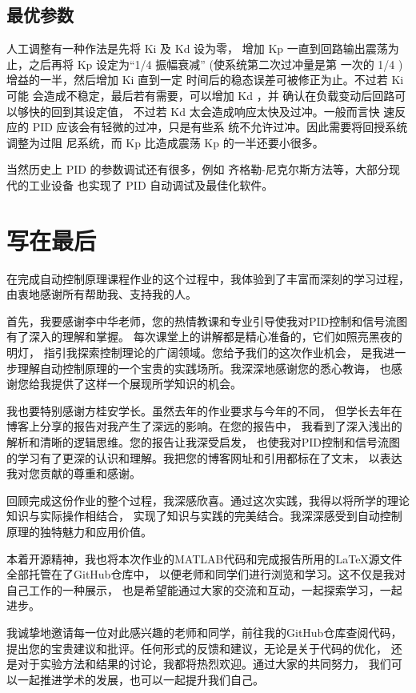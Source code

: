 \documentclass{thuemp}
\begin{document}
\subsection{最优参数}
人工调整有一种作法是先将 Ki 及 Kd 设为零，
增加 Kp 一直到回路输出震荡为止，之后再将 Kp
设定为“1/4 振幅衰减” (使系统第二次过冲量是第
一次的 1/4 ) 增益的一半，然后增加 Ki 直到一定
时间后的稳态误差可被修正为止。不过若 Ki 可能
会造成不稳定，最后若有需要，可以增加 Kd ，并
确认在负载变动后回路可以够快的回到其设定值，
不过若 Kd 太会造成响应太快及过冲。一般而言快
速反应的 PID 应该会有轻微的过冲，只是有些系
统不允许过冲。因此需要将回授系统调整为过阻
尼系统，而 Kp 比造成震荡 Kp 的一半还要小很多。\cite{PID}

当然历史上 PID 的参数调试还有很多，例如
齐格勒-尼克尔斯方法等，大部分现代的工业设备
也实现了 PID 自动调试及最佳化软件。

\section*{写在最后}
在完成自动控制原理课程作业的这个过程中，我体验到了丰富而深刻的学习过程，
由衷地感谢所有帮助我、支持我的人。

首先，我要感谢李中华老师，您的热情教课和专业引导使我对PID控制和信号流图有了深入的理解和掌握。
每次课堂上的讲解都是精心准备的，它们如照亮黑夜的明灯，
指引我探索控制理论的广阔领域。您给予我们的这次作业机会，
是我进一步理解自动控制原理的一个宝贵的实践场所。我深深地感谢您的悉心教诲，
也感谢您给我提供了这样一个展现所学知识的机会。

我也要特别感谢方桂安学长。虽然去年的作业要求与今年的不同，
但学长去年在博客上分享的报告对我产生了深远的影响。在您的报告中，
我看到了深入浅出的解析和清晰的逻辑思维。您的报告让我深受启发，
也使我对PID控制和信号流图的学习有了更深的认识和理解。我把您的博客网址和引用都标在了文末，
以表达我对您贡献的尊重和感谢。

回顾完成这份作业的整个过程，我深感欣喜。通过这次实践，我得以将所学的理论知识与实际操作相结合，
实现了知识与实践的完美结合。我深深感受到自动控制原理的独特魅力和应用价值。

本着开源精神，我也将本次作业的MATLAB代码和完成报告所用的\LaTeX 源文件全部托管在了GitHub仓库中，
以便老师和同学们进行浏览和学习。这不仅是我对自己工作的一种展示，
也是希望能通过大家的交流和互动，一起探索学习，一起进步。

我诚挚地邀请每一位对此感兴趣的老师和同学，前往我的GitHub仓库查阅代码，
提出您的宝贵建议和批评。任何形式的反馈和建议，无论是关于代码的优化，
还是对于实验方法和结果的讨论，我都将热烈欢迎。通过大家的共同努力，
我们可以一起推进学术的发展，也可以一起提升我们自己。
\end{document}
